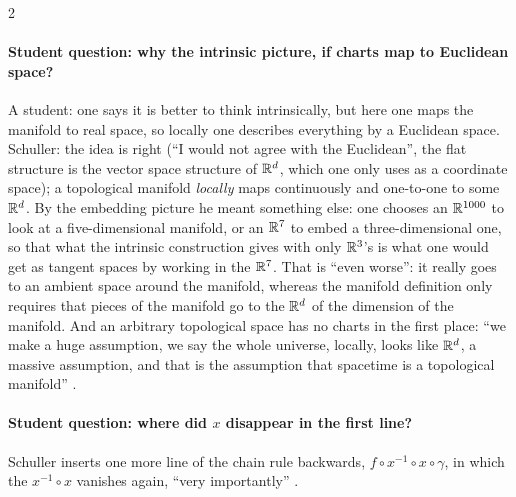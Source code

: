 \begin{paracol}{2}
\paragraph{Student question: why the intrinsic picture, if charts map to Euclidean space?} A student: one says it is better to think intrinsically, but here one maps the manifold to real space, so locally one describes everything by a Euclidean space. Schuller: the idea is right (``I would not agree with the Euclidean'', the flat structure is the vector space structure of $\mathbb{R}^d$, which one only uses as a coordinate space);
a topological manifold \emph{locally} maps continuously and one-to-one to some $\mathbb{R}^d$. By the embedding picture he meant something else: one chooses an $\mathbb{R}^{1000}$ to look at a five-dimensional manifold, or an $\mathbb{R}^7$ to embed a three-dimensional one, so that what the intrinsic construction gives with only $\mathbb{R}^3$'s is what one would get as tangent spaces by working in the $\mathbb{R}^7$. That is ``even worse'': it really goes to an ambient space around the manifold, whereas the manifold definition only requires that pieces of the manifold go to the $\mathbb{R}^d$ of the dimension of the manifold.
And an arbitrary topological space has no charts in the first place: ``we make a huge assumption, we say the whole universe, locally, looks like $\mathbb{R}^d$, a massive assumption, and that is the assumption that spacetime is a topological manifold'' .

\paragraph{Student question: where did $x$ disappear in the first line?} Schuller inserts one more line of the chain rule backwards, $f\circ x^{-1}\circ x\circ\gamma$, in which the $x^{-1}\circ x$ vanishes again, ``very importantly'' .


\end{paracol}
